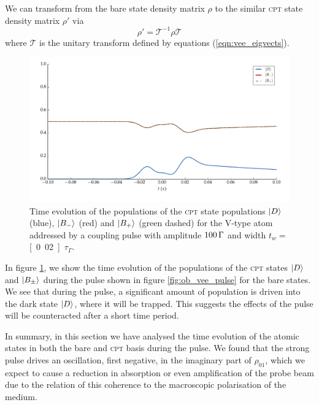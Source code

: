     We can transform from the bare state density matrix $\rho$ to the similar
    \textsc{cpt} state density matrix $\rho'$ via
    \begin{equation}
      \rho' = \mathcal{T}^{-1} \rho \mathcal{T}
      \label{eqn:rho01}
    \end{equation}
    where $\mathcal{T}$ is the unitary transform defined by equations
    (\ref{eqn:vee_eigvects}).

    \begin{figure}[]
    \includegraphics[width=\linewidth]{figs/06_simultons/ob_vee_solve_pls_t002_50c_100p_fig2.pdf}
    \caption{
    Time evolution of the populations of the \textsc{cpt} state populations
    $\Ket{D}$ (blue), $\Ket{B_-}$ (red) and $\Ket{B_+}$ (green dashed) for the
    V-type atom addressed by a coupling pulse with amplitude $\unit[100]\Gamma$
    and width $t_w = $ \unit[0.02]{$\tau_\Gamma$}.
    }
    \label{fig:wp_propagation} 
    \end{figure}

    In figure \ref{fig:wp_propagation}, we show the time evolution of the
    populations of the \textsc{cpt} states $\Ket{D}$ and $\Ket{B_\pm}$ during
    the pulse shown in figure \ref{fig:ob_vee_pulse} for the bare states. We
    see that during the pulse, a significant amount of population is driven into
    the dark state $\Ket{D}$, where it will be trapped. This suggests the
    effects of the pulse will be counteracted after a short time period.

    In summary, in this section we have analysed the time evolution of the
    atomic states in both the bare and \textsc{cpt} basis during the pulse. We
    found that the strong pulse drives an oscillation, first negative, in the
    imaginary part of $\rho_{01}$, which we expect to cause a reduction in
    absorption or even amplification of the probe beam due to the relation of
    this coherence to the macroscopic polarisation of the medium.

